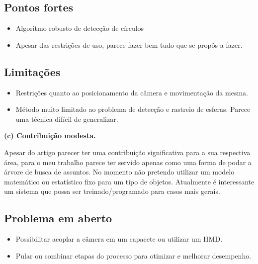 \subsection{Pontos fortes} %
\begin{itemize}
  \item Algoritmo robusto de detecção de círculos
  \item Apesar das restrições de uso, parece fazer bem tudo que se propôs a fazer.
\end{itemize}  

\subsection{Limitações} %
\begin{itemize}
  \item Restrições quanto ao posicionamento da câmera e movimentação da mesma.
  \item Método muito limitado ao problema de detecção e rastreio de esferas. Parece uma técnica difícil de generalizar.
\end{itemize} 


 \textbf{(c) Contribuição modesta.}

Apesar do artigo parecer ter uma contribuição significativa para a sua respectiva área, para o meu trabalho parece ter servido apenas como uma forma de podar a árvore de busca de assuntos. No momento não pretendo utilizar um modelo matemático ou estatístico fixo para um tipo de objetos. Atualmente é interessante um sistema que possa ser treinado/programado para casos mais gerais.

\subsection{Problema em aberto}
 \begin{itemize}
   \item Possibilitar acoplar a câmera em um capacete ou utilizar um HMD.
   \item Pular ou combinar etapas do processo para otimizar e melhorar desempenho.
 \end{itemize}  

